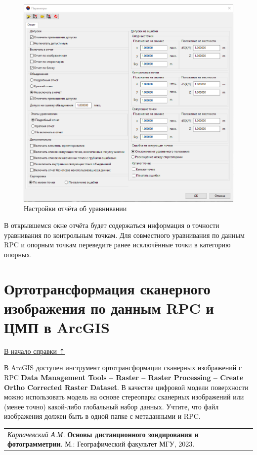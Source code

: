 \documentclass[
  12pt,
]{book}
\begin{document}
\begin{figure}
\centering
\includegraphics{images/Ref17/Report_Settings.png}
\caption{Настройки отчёта об уравнивании}
\end{figure}

В открывшемся окне отчёта будет содержаться информация о точности уравнивания по контрольным точкам. Для совместного уравнивания по данным RPC и опорным точкам переведите ранее исключённые точки в категорию опорных.

\hypertarget{rpc-orthorectification}{%
\section{Ортотрансформация сканерного изображения по данным RPC и ЦМП в ArcGIS}\label{rpc-orthorectification}}

\protect\hyperlink{rpc}{В начало справки ⇡}

В ArcGIS доступен инструмент ортотрансформации сканерных изображений с RPC \textbf{Data Management Tools -- Raster -- Raster Processing -- Create Ortho Corrected Raster Dataset}. В качестве цифровой модели поверхности можно использовать модель на основе стереопары сканерных изображений или (менее точно) какой-либо глобальный набор данных. Учтите, что файл изображения должен быть в одной папке с метаданными и RPC.

\begin{longtable}[]{@{}l@{}}
\toprule\noalign{}
\endhead
\bottomrule\noalign{}
\endlastfoot
\emph{Карпачевский А.М.} \textbf{Основы дистанционного зондирования и фотограмметрии}. М.: Географический факультет МГУ, 2023. \\
\end{longtable}
\end{document}
